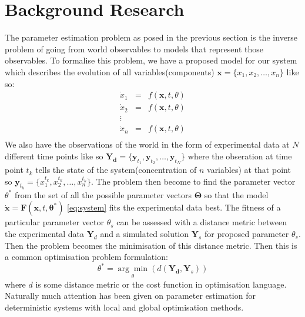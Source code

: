 \documentclass[12pt,a4paper,titlepage]{article}
\begin{document}
\section{Background Research}
\label{sec:background}
The parameter estimation problem as posed in the previous section is the inverse problem of going from world observables to models that represent those observables. To formalise this problem, we have a proposed model for our system which describes the evolution of all variables(components) $\mathbf{x} = \{x_1, x_2, \dots, x_n\}$ like so:
\begin{equation}
\label{eq:system}
\begin{array}{lcl}
\dot x_1 & = & f(\mathbf{x}, t, \theta) \\
\dot x_2& = & f(\mathbf{x}, t, \theta) \\
\vdots \\
\dot x_n & = & f(\mathbf{x}, t, \theta) \\
\end{array}
\end{equation}
We also have the observations of the world in the form of experimental data at $N$ different time points like so $\mathbf{Y_d} = \{\mathbf{y}_{t_{1}},  \mathbf{y}_{t_{2}}, \dots, \mathbf{y}_{t_{N}}\}$ where the obseration at time point $t_{k}$ tells the state of the system(concentration of $n$ variables) at that point so 
$\mathbf{y}_{t_{k}} =\{ x_{1}^{t_{k}},  x_{2}^{t_{k}}, \dots,  x_{n}^{t_{k}} \}$. The problem then become to find the parameter vector $\theta^*$ from the set of all the possible parameter vectors $\mathbf{\Theta}$ so that the model $\mathbf{\dot x} = \mathbf{F}(\mathbf{x}, t, \mathbf{\theta^*})$  \ref{eq:system} fits the experimental data best. The fitness of a particular parameter vector $\theta_{s}$ can be assessed with a distance metric between the experimental data $\mathbf{Y}_{d}$ and a simulated solution $\mathbf{Y}_{s}$ for proposed parameter $\theta_{s}$. Then the problem becomes the minimisation of this distance metric. Then this is a common optimisation problem formulation: 
\begin{equation*}
\theta^* = \underset{\theta}{\arg\min}(d(\mathbf{Y_{d}},\mathbf{Y}_{s})) 
\end{equation*}
where $d$ is some distance metric or the cost function in optimisation language. Naturally much attention has been given on parameter estimation for deterministic systems with local and global optimisation methods\cite{Moles2003param}.  %
\end{document}
